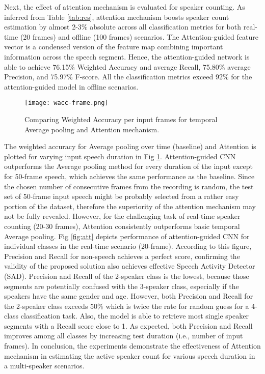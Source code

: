 \documentclass[a4paper]{article}
\begin{document}
Next, the effect of attention mechanism is evaluated for speaker counting. As inferred from Table \ref{tab:res}, attention mechanism boosts speaker count estimation by almost 2-3\% absolute across all classification metrics for both real-time (20 frames) and offline (100 frames) scenarios. The Attention-guided feature vector is a condensed version of the feature map combining important information across the speech segment. Hence, the attention-guided network is able to achieve 76.15\% Weighted Accuracy and average Recall, 75.80\%  average Precision,  and 75.97\% F-score. All the classification metrics exceed 92\% for the attention-guided model in offline scenarios. 

\begin{figure}
\vspace{-0.4cm}
\centering
\texttt{[image: wacc-frame.png]}
\vspace{-0.9cm}
\caption{Comparing Weighted Accuracy per input frames for temporal Average pooling and Attention mechanism. }
\vspace{-0.5cm}
\label{fig:wacc-frame}
\end{figure}

The weighted accuracy for Average pooling over time (baseline) and Attention is plotted for varying input speech duration in Fig \ref{fig:wacc-frame}. Attention-guided CNN outperforms the Average pooling method for every duration of the input except for 50-frame speech, which achieves the same performance as the baseline. Since the chosen number of consecutive frames from the recording is random, the test set of 50-frame input speech might be probably selected from a rather easy portion of the dataset, therefore the superiority of the attention mechanism may not be fully revealed. However, for the challenging task of real-time speaker counting (20-30 frames), Attention consistently outperforms basic temporal Average pooling.  Fig \ref{fig:att} depicts performance of attention-guided CNN for individual classes in the real-time scenario (20-frame). According to this figure, Precision and Recall for non-speech achieves a perfect score, confirming the validity of the proposed solution also achieves effective Speech Activity Detector (SAD). Precision and Recall of the  2-speaker class is the lowest, because those segments are potentially confused with the 3-speaker class, especially if the speakers have the same gender and age. However, both Precision and Recall for the 2-speaker class exceeds 50\% which is twice the rate for random guess for a 4-class classification task. Also, the model is able to retrieve most single speaker segments with a Recall score close to 1. As expected, both Precision and Recall improves among all classes by increasing test duration (i.e., number of input frames). In conclusion, the experiments demonstrate the effectiveness of Attention mechanism in estimating the active speaker count for various speech duration in a multi-speaker scenarios.
\end{document}
